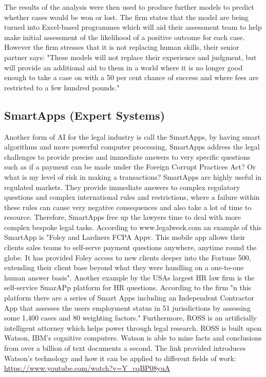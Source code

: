 \documentclass[12pt]{article}
\begin{document}
\newline
\newline
The results of the analysis were then used to produce further models to predict whether cases would be won or lost. The firm states that the model are being turned into Excel-based programmes which will aid their assessment team to help make initial assessment of the likelihood of a positive outcome for each case. However the firm stresses that it is not replacing human skills, their senior partner says: "These models will not replace their experience and judgment, but will provide an additional aid to them in a world where it is no longer good enough to take a case on with a 50 per cent chance of success and where fees are restricted to a few hundred pounds."

\subsection{SmartApps (Expert Systems)}
Another form of AI for the legal industry is call the SmartApps, by having smart algorithms and more powerful computer processing, SmartApps address the legal challenges to provide precise and immediate answers to very specific questions such as if a payment can be made under the Foreign Corrupt Practices Act? Or what is my level of risk in making a transactions?
\newline
\newline
SmartApps are highly useful in regulated markets. They provide immediate answers to complex regulatory questions and complex international rules and restrictions, where a failure within these rules can cause very negative consequences and also take a lot of time to resource. Therefore, SmartApps free up the lawyers time to deal with more complex bespoke legal tasks. According to www.legalweek.com an example of this SmartApp is "Foley and Lardners FCPA Appv. This mobile app allows their clients sales teams to self-serve payment questions anywhere, anytime round the globe. It has provided Foley access to new clients deeper into the Fortune 500, extending their client base beyond what they were handling on a one-to-one human answer basis".
\newline
\newline
Another example by the USAs largest HR law firm is the self-service SmarAPp platform for HR questions. According to the firm "n this platform there are a series of Smart Apps including an Independent Contractor App that assesses the users employment status in 51 jurisdictions by assessing some 1,400 cases and 80 weighting factors."
\newline
\newline
Furthermore, ROSS is an artificially intelligent attorney which helps power through legal research. ROSS is built upon Watson, IBM's cognitive computers. Watson is able to mine facts and conclusions from over a billion of text documents a second. The link provided introduces Watson's technology and how it can be applied to different fields of work:         
\newline
 \url{https://www.youtube.com/watch?v=Y_cqBP08yuA}
\end{document}
